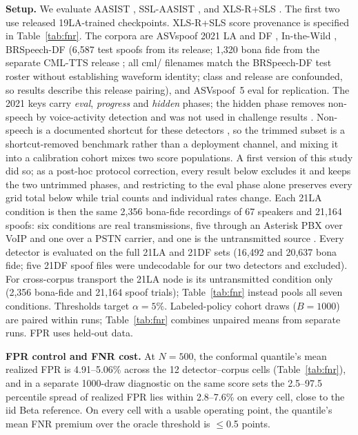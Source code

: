 \documentclass{article}
\begin{document}
\label{sec:exp}
\textbf{Setup.} We evaluate AASIST \cite{jung22}, SSL-AASIST \cite{tak22}, and XLS-R+SLS \cite{zhang24sls}. The first two use released 19LA-trained checkpoints. XLS-R+SLS score provenance is specified in Table~\ref{tab:fnr}. The corpora are ASVspoof 2021 LA and DF \cite{asvspoof21}, In-the-Wild \cite{itw}, BRSpeech-DF \cite{brspeechdf} (6,587 test spoofs from its release; 1,320 bona fide from the separate CML-TTS release \cite{cmltts23}; all cml/ filenames match the BRSpeech-DF test roster without establishing waveform identity; class and release are confounded, so results describe this release pairing), and ASVspoof~5 eval \cite{asvspoof5} for replication. The 2021 keys carry \emph{eval}, \emph{progress} and \emph{hidden} phases; the hidden phase removes non-speech by voice-activity detection and was not used in challenge results \cite{asvspoof21taslp}. Non-speech is a documented shortcut for these detectors \cite{rubio26}, so the trimmed subset is a shortcut-removed benchmark \cite{dao26} rather than a deployment channel, and mixing it into a calibration cohort mixes two score populations. A first version of this study did so; as a post-hoc protocol correction, every result below excludes it and keeps the two untrimmed phases, and restricting to the eval phase alone preserves every grid total below while trial counts and individual rates change. Each 21LA condition is then the same 2,356 bona-fide recordings of 67 speakers and 21,164 spoofs: six conditions are real transmissions, five through an Asterisk PBX over VoIP and one over a PSTN carrier, and one is the untransmitted source \cite{asvspoof21}. Every detector is evaluated on the full 21LA and 21DF sets (16,492 and 20,637 bona fide; five 21DF spoof files were undecodable for our two detectors and excluded). For cross-corpus transport the 21LA node is its untransmitted condition only (2,356 bona-fide and 21,164 spoof trials); Table~\ref{tab:fnr} instead pools all seven conditions. Thresholds target $\alpha{=}5\%$. Labeled-policy cohort draws ($B{=}1000$) are paired within runs; Table~\ref{tab:fnr} combines unpaired means from separate runs. FPR uses held-out data.

\textbf{FPR control and FNR cost.} At $N{=}500$, the conformal quantile's mean realized FPR is 4.91--5.06\% across the 12 detector--corpus cells (Table~\ref{tab:fnr}), and in a separate 1000-draw diagnostic on the same score sets the 2.5--97.5 percentile spread of realized FPR lies within 2.8--7.6\% on every cell, close to the iid Beta reference. On every cell with a usable operating point, the quantile's mean FNR premium over the oracle threshold is $\le$0.5 points.
\end{document}
